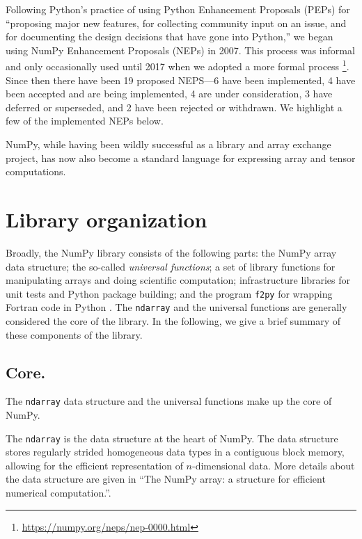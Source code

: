 \documentclass[fleqn,10pt]{wlscirep}
\newcommand{\code}[1]{\texttt{#1}}
\begin{document}

Following Python's practice of using Python Enhancement Proposals (PEPs) for
``proposing major new features, for collecting community input on an
issue, and for documenting the design decisions that have gone into Python,''
we began using NumPy Enhancement Proposals (NEPs) in 2007.
This process was informal and only occasionally used until 2017 when
we adopted a more formal process \footnote{\url{https://numpy.org/neps/nep-0000.html}}.
Since then there have been 19 proposed NEPS---6 have been implemented,
4 have been accepted and are being implemented, 4 are under consideration,
3 have deferred or superseded, and 2 have been rejected or withdrawn.
We highlight a few of the implemented NEPs below.



NumPy, while having been wildly successful as a library and array exchange
project, has now also become a standard language for expressing array and
tensor computations.  


\section*{Library organization}

Broadly, the NumPy library consists of the following parts:
the NumPy array data structure; the so-called \emph{universal functions};
a set of library functions for manipulating arrays and doing scientific
computation; infrastructure libraries for unit tests and Python package
building; and the program \code{f2py} for wrapping Fortran code in Python \cite{peterson2009f2py}.
The \code{ndarray} and the universal functions are generally considered
the core of the library.
In the following, we give a brief summary of these components of the
library.

\subsection*{Core.}

The \code{ndarray} data structure and the universal functions make up the core
of NumPy.

The \code{ndarray} is the data structure at the heart of NumPy.
The data structure stores regularly strided homogeneous data types
in a contiguous block memory, allowing for the efficient representation
of $n$-dimensional data.
More details about the data structure are given in ``The NumPy array:
a structure for efficient numerical computation.''\cite{vanderwalt2011numpy}.
\end{document}
